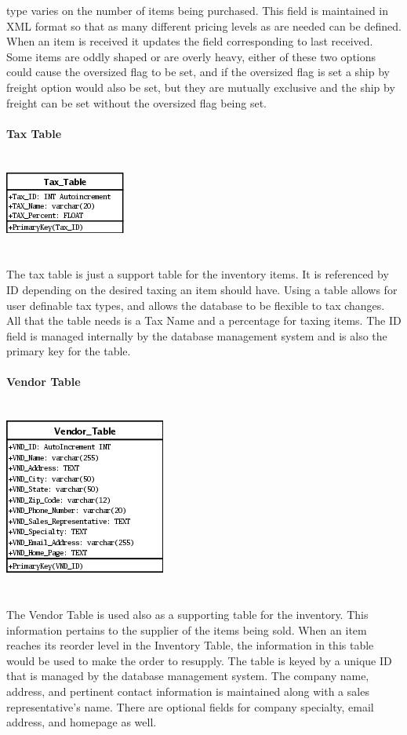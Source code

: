 \documentclass{report}
\begin{document}
    type varies on the number of items being purchased. This field is maintained in XML
    format so that as many different pricing levels as are needed can be defined. When an
    item is received it updates the field corresponding to last received. Some items are
    oddly shaped or are overly heavy, either of these two options could cause the oversized
    flag to be set, and if the oversized flag is set a ship by freight option would also be
    set, but they are mutually exclusive and the ship by freight can be set without the
    oversized flag being set.\\
    \\
    {\bf Tax Table}\\
    \\
    \\
    \includegraphics{Tables/TaxTable.png}\\
    \\
    \\
    The tax table is just a support table for the inventory items. It is referenced by ID
    depending on the desired taxing an item should have. Using a table allows for user definable
    tax types, and allows the database to be flexible to tax changes. All that the table needs
    is a Tax Name and a percentage for taxing items. The ID field is managed internally by the
    database management system and is also the primary key for the table.\\
    \\
    {\bf Vendor Table}\\
    \\
    \\
    \includegraphics{Tables/VendorTable.png}\\
    \\
    \\
    The Vendor Table is used also as a supporting table for the inventory. This information
    pertains to the supplier of the items being sold. When an item reaches its reorder level
    in the Inventory Table, the information in this table would be used to make the order to
    resupply. The table is keyed by a unique ID that is managed by the database management
    system. The company name, address, and pertinent contact information is maintained along
    with a sales representative's name. There are optional fields for company specialty, email
    address, and homepage as well.
\end{document}
